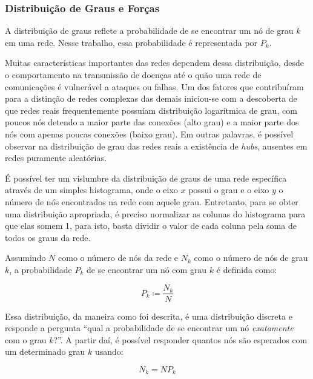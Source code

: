 \documentclass[12pt,a4paper,final]{article}
\newcommand{\defn}{\coloneqq} %
\begin{document}
\subsubsection{Distribuição de Graus e Forças} \label{sec:distribuicao-grau-forca}

A distribuição de graus reflete a probabilidade de se encontrar um nó de grau $k$ em uma rede. Nesse trabalho, essa probabilidade é representada por $P_k$.

Muitas características importantes das redes dependem dessa distribuição, desde o comportamento na transmissão de doenças até o quão uma rede de comunicações é vulnerável a ataques ou falhas. Um dos fatores que contribuíram para a distinção de redes complexas das demais iniciou-se com a descoberta de \cite{Barabasi1999-sn} que redes reais frequentemente possuíam distribuição logarítmica de grau, com poucos nós detendo a maior parte das conexões (alto grau) e a maior parte dos nós com apenas poucas conexões (baixo grau). Em outras palavras, é possível observar na distribuição de grau das redes reais a existência de \textit{hubs}, ausentes em redes puramente aleatórias.

É possível ter um vislumbre da distribuição de graus de uma rede específica através de um simples histograma, onde o eixo $x$ possui o grau e o eixo $y$ o número de nós encontrados na rede com aquele grau. Entretanto, para se obter uma distribuição apropriada, é preciso normalizar as colunas do histograma para que elas somem 1, para isto, basta dividir o valor de cada coluna pela soma de todos os graus da rede.

Assumindo $N$ como o número de nós da rede e $N_k$ como o número de nós de grau $k$, a probabilidade $P_k$ de se encontrar um nó com grau $k$ é definida como:

\begin{equation} \label{eq:probabilidade-grau}
P_k \defn \frac{N_k}{N}
\end{equation}

Essa distribuição, da maneira como foi descrita, é uma distribuição discreta e responde a pergunta \enquote{qual a probabilidade de se encontrar um nó \textit{exatamente}~ com o grau $k$?}. A partir daí, é possível responder quantos nós são esperados com um determinado grau $k$ usando:

\begin{equation}
N_k = NP_k
\end{equation} 
\end{document}
